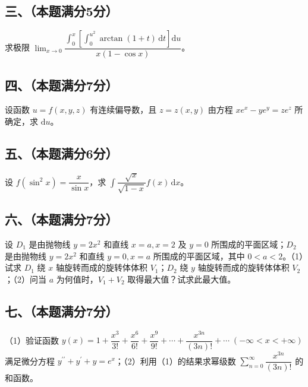 \documentclass[UTF8,12pt]{ctexart}
\begin{document}
\subsection*{三、（本题满分5分）}

求极限 \(\displaystyle \lim_{x\to0}\dfrac{\displaystyle \int_0^x\left[\displaystyle \int_0^{u^2}\arctan(1+t)\,\mathrm dt\right]\mathrm du}{\displaystyle x(1-\cos x)}\)。


\subsection*{四、（本题满分7分）}

设函数 \(\displaystyle u=f(x,\allowbreak y,\allowbreak z)\) 有连续偏导数，且 \(\displaystyle z=z(x,\allowbreak y)\) 由方程 \(\displaystyle xe^x-ye^y=ze^z\) 所确定，求 \(\displaystyle \mathrm du\)。


\subsection*{五、（本题满分6分）}

设 \(\displaystyle f(\sin^2x)=\dfrac{\displaystyle x}{\displaystyle \sin x}\)，求 \(\displaystyle \int\dfrac{\displaystyle \sqrt x}{\displaystyle \sqrt{1-x}}f(x)\,\mathrm dx\)。


\subsection*{六、（本题满分7分）}

设 \(\displaystyle D_1\) 是由抛物线 \(\displaystyle y=2x^2\) 和直线 \(\displaystyle x=a,\allowbreak x=2\) 及 \(\displaystyle y=0\) 所围成的平面区域；\(\displaystyle D_2\) 是由抛物线 \(\displaystyle y=2x^2\) 和直线 \(\displaystyle y=0,\allowbreak x=a\) 所围成的平面区域，其中 \(\displaystyle 0<a<2\)。（1）试求 \(\displaystyle D_1\) 绕 \(\displaystyle x\) 轴旋转而成的旋转体体积 \(\displaystyle V_1\)；\(\displaystyle D_2\) 绕 \(\displaystyle y\) 轴旋转而成的旋转体体积 \(\displaystyle V_2\)；（2）问当 \(\displaystyle a\) 为何值时，\(\displaystyle V_1+V_2\) 取得最大值？试求此最大值。


\subsection*{七、（本题满分7分）}

（1）验证函数 \(\displaystyle y(x)=1+\dfrac{\displaystyle x^3}{\displaystyle 3!}+\dfrac{\displaystyle x^6}{\displaystyle 6!}+\dfrac{\displaystyle x^9}{\displaystyle 9!}+\cdots+\dfrac{\displaystyle x^{3n}}{\displaystyle (3n)!}+\cdots\;(-\infty<x<+\infty)\) 满足微分方程 \(\displaystyle y^{\prime\prime}+y^{\prime}+y=e^x\)；（2）利用（1）的结果求幂级数 \(\displaystyle \sum_{n=0}^{\infty}\dfrac{\displaystyle x^{3n}}{\displaystyle (3n)!}\) 的和函数。
\end{document}
